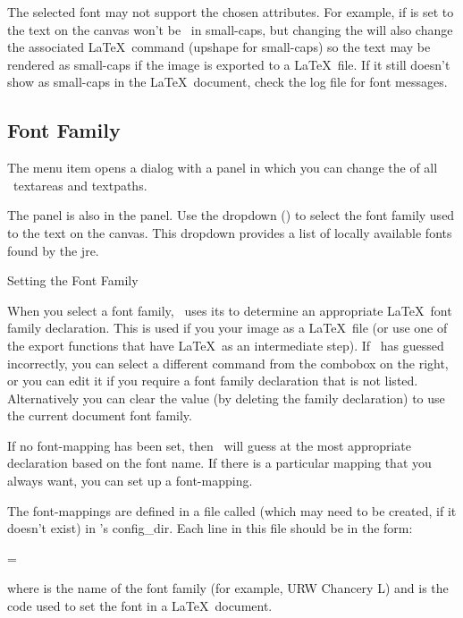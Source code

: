 The selected font may not support the chosen attributes.
For example, if  is set to 
 the text on the \gls{canvas} won't be
\rendered\ in small-caps, but changing the 
will also change the associated \LaTeX\ command (\gls{upshape} for
small-caps) so the text may be rendered as small-caps if the image
is exported to a \LaTeX\ file. If it still doesn't show as
small-caps in the \LaTeX\ document, check the log file for font
messages.

\subsection{Font Family}\label{sec:fontfamily}


The  menu item opens a dialog with a 
 panel in which you can change the
of all \selected\ \glspl{textarea} and \glspl{textpath}.


The  panel is also in the 
panel. Use the \gls{dropdown} () to
select the font family used to  the
text on the \gls{canvas}.  This \gls{dropdown} provides a list of
locally available fonts found by the \gls{jre}.

{}
{Setting the Font Family}

When you select a font family, \FlowframTk\ uses its
 to determine
an appropriate \LaTeX\ font family declaration.  This is used if you
 your image as a \LaTeX\ file (or use one of the
export functions that have \LaTeX\ as an intermediate step). If
\FlowframTk\ has guessed incorrectly, you can select a different
command from the \gls{combobox} on the right, or you can edit it if
you require a font family declaration that is not listed.
Alternatively you can clear the value (by deleting the family
declaration) to use the current document font family.

If no \gls{font-mapping} has been set, then \FlowframTk\ will guess
at the most appropriate declaration based on the font name.
If there is a particular mapping that you always
want, you can set up a \gls{font-mapping}.

The \glspl{font-mapping} are defined in a file called
 (which may need to be created, if it
doesn't exist) in \FlowframTk's \gls{config_dir}.
Each line in this file should be in the form:
\begin{compactcodebox}
=
\end{compactcodebox}%
where  is the name of the font family (for example,
URW Chancery L) and  is the
code used to set the font in a \LaTeX\ document.

